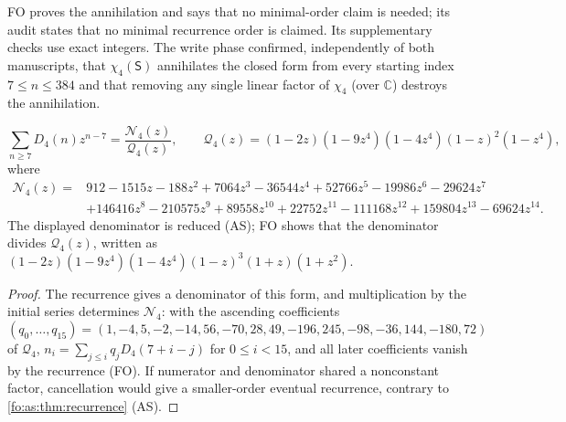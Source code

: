 \documentclass[11pt,a4paper]{article}
\numberwithin{equation}{section}
\theoremstyle{definition}
\theoremstyle{remark}
\begin{document}
FO proves the annihilation and says that no minimal-order claim is needed;
its audit states that no minimal recurrence order is claimed. Its supplementary
checks use exact integers. The write phase confirmed, independently of both
manuscripts, that $\chi_4(\mathsf S)$ annihilates the closed form from
every starting index $7\le n\le384$ and that removing any single linear factor of $\chi_4$ (over
$\mathbb C$) destroys the annihilation.

\begin{corollary}\label{fo:as:cor:gf}
\begin{equation}\label{fo:eq:gf}
 \sum_{n\ge7}D_4(n)z^{n-7}=\frac{\mathcal N_4(z)}{\mathcal Q_4(z)},\qquad
 \mathcal Q_4(z)=(1-2z)(1-9z^4)(1-4z^4)(1-z)^2(1-z^4),
\end{equation}
where
\begin{align*}
 \mathcal N_4(z)={}&912-1515z-188z^2+7064z^3-36544z^4+52766z^5-19986z^6
 -29624z^7\\
 &+146416z^8-210575z^9+89558z^{10}+22752z^{11}-111168z^{12}
 +159804z^{13}-69624z^{14}.
\end{align*}
The displayed denominator is reduced \textup{(AS)}; FO shows that the
denominator divides $\mathcal Q_4(z)$, written as
$(1-2z)(1-9z^4)(1-4z^4)(1-z)^3(1+z)(1+z^2)$.
\end{corollary}

\begin{proof}
The recurrence gives a denominator of this form, and multiplication by the
initial series determines $\mathcal N_4$: with the ascending coefficients
\[
(q_0,\ldots,q_{15})=(1,-4,5,-2,-14,56,-70,28,49,-196,245,-98,-36,144,-180,72)
\]
of $\mathcal Q_4$, $n_i=\sum_{j\le i}q_jD_4(7+i-j)$ for $0\le i<15$, and all
later coefficients vanish by the recurrence (FO). If numerator and denominator
shared a nonconstant factor, cancellation would give a smaller-order eventual
recurrence, contrary to \cref{fo:as:thm:recurrence} (AS).
\end{proof}
\end{document}
